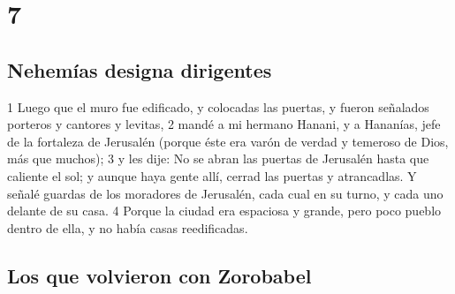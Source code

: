 \chapter{7}

\section*{Nehemías designa dirigentes}

1 Luego que el muro fue edificado, y colocadas las puertas, y fueron señalados porteros y cantores y levitas,
2 mandé a mi hermano Hanani, y a Hananías, jefe de la fortaleza de Jerusalén (porque éste era varón de verdad y temeroso de Dios, más que muchos);
3 y les dije: No se abran las puertas de Jerusalén hasta que caliente el sol; y aunque haya gente allí, cerrad las puertas y atrancadlas. Y señalé guardas de los moradores de Jerusalén, cada cual en su turno, y cada uno delante de su casa.
4 Porque la ciudad era espaciosa y grande, pero poco pueblo dentro de ella, y no había casas reedificadas.

\section*{Los que volvieron con Zorobabel}

